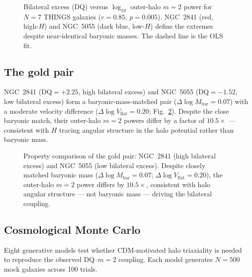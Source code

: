 \documentclass[fleqn,usenatbib]{mnras}
\newcommand{\vflat}{V_\mathrm{flat}}
\newcommand{\DQ}{\mathrm{DQ}}
\newcommand{\mtwo}{m{=}2}
\begin{document}
\begin{figure}
\centering

\caption{Bilateral excess ($\DQ$) versus $\log_{10}$ outer-halo $\mtwo$ power for $N = 7$ THINGS galaxies ($r = 0.85$, $p = 0.005$). NGC~2841 (red, high-$H$) and NGC~5055 (dark blue, low-$H$) define the extremes despite near-identical baryonic masses. The dashed line is the OLS fit.}
\label{fig:dq_m2}
\end{figure}

\subsection{The gold pair}

NGC~2841 ($\DQ = +2.25$, high bilateral excess) and NGC~5055 ($\DQ = -1.52$, low bilateral excess) form a baryonic-mass-matched pair ($\Delta\log M_\mathrm{bar} = 0.07$) with a moderate velocity difference ($\Delta\log\vflat = 0.20$; Fig.~\ref{fig:goldpair}).
Despite the close baryonic match, their outer-halo $\mtwo$ powers differ by a factor of $10.5\times$ --- consistent with $H$ tracing angular structure in the halo potential rather than baryonic mass.

\begin{figure}
\centering

\caption{Property comparison of the gold pair: NGC~2841 (high bilateral excess) and NGC~5055 (low bilateral excess). Despite closely matched baryonic mass ($\Delta\log M_\mathrm{bar} = 0.07$; $\Delta\log\vflat = 0.20$), the outer-halo $\mtwo$ power differs by $10.5\times$, consistent with halo angular structure --- not baryonic mass --- driving the bilateral coupling.}
\label{fig:goldpair}
\end{figure}

\subsection{Cosmological Monte Carlo}

Eight generative models test whether CDM-motivated halo triaxiality is needed to reproduce the observed $\DQ$--$\mtwo$ coupling.
Each model generates $N = 500$ mock galaxies across 100 trials.
\end{document}
